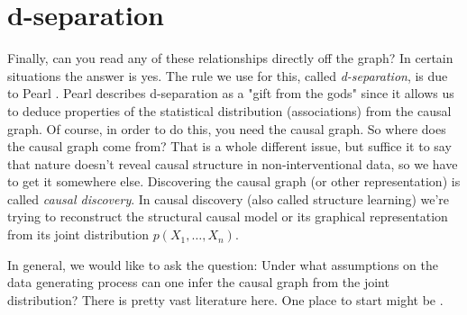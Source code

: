 \documentclass[11pt, oneside]{article}   	%
\begin{document}
\section{d-separation}
Finally, can you read any of these relationships directly off the graph? In certain situations the answer is yes. The rule we use for this, called \emph{d-separation}, is due
to Pearl \cite{Pearl:1988:PRI:52121}. Pearl describes d-separation as a "gift from the gods" since it allows us to deduce properties of the statistical distribution (associations) 
from the causal  graph. Of course, in order to do this, you need the causal graph. So where does the causal graph come from? That is a whole different issue, but suffice it to 
say that nature doesn't reveal causal structure in non-interventional data, so we have to get it somewhere else. Discovering the causal graph (or other representation) is called 
\emph{causal discovery}.  In causal discovery (also called structure learning) we're trying to reconstruct the structural causal model or its graphical representation from its joint 
distribution $p(X_1, \hdots, X_n)$.

\bigskip
\noindent
In general, we would like to ask the question:  Under what 
assumptions on the data generating process can one infer the causal graph from the joint distribution? There is pretty vast literature here. One place to start might be 
\cite{Peters:2011:ICG:3020548.3020617}. 





\end{document}
